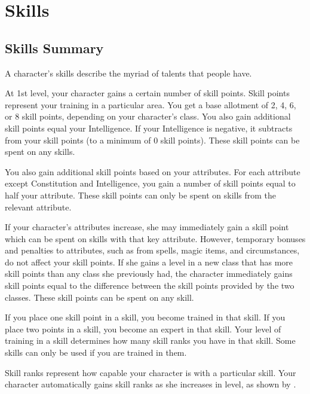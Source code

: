 \chapter{Skills}
\section{Skills Summary}
A character's skills describe the myriad of talents that people have.

 At 1st level, your character gains a certain number of skill points. Skill points represent your training in a particular area. You get a base allotment of 2, 4, 6, or 8 skill points, depending on your character's class. You also gain additional skill points equal your Intelligence. If your Intelligence is negative, it subtracts from your skill points (to a minimum of 0 skill points). These skill points can be spent on any skills.

You also gain additional skill points based on your attributes. For each attribute except Constitution and Intelligence, you gain a number of skill points equal to half your attribute. These skill points can only be spent on skills from the relevant attribute.

\par If your character's attributes increase, she may immediately gain a skill point which can be spent on skills with that key attribute. However, temporary bonuses and penalties to attributes, such as from spells, magic items, and circumstances, do not affect your skill points. If she gains a level in a new class that has more skill points than any class she previously had, the character immediately gains skill points equal to the difference between the skill points provided by the two classes. These skill points can be spent on any skill.

 If you place one skill point in a skill, you become trained in that skill. If you place two points in a skill, you become an expert in that skill. Your level of training in a skill determines how many skill ranks you have in that skill. Some skills can only be used if you are trained in them.

Skill ranks represent how capable your character is with a particular skill. Your character automatically gains skill ranks as she increases in level, as shown by .

